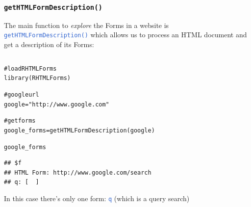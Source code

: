 \documentclass{beamer}\usepackage[]{graphicx}\usepackage[]{color}
\makeatletter
\newcommand{\hlstr}[1]{\textcolor[rgb]{0.063,0.58,0.627}{#1}}%
\newcommand{\hlcom}[1]{\textcolor[rgb]{0.588,0.588,0.588}{#1}}%
\newcommand{\hlopt}[1]{\textcolor[rgb]{0.196,0.196,0.196}{#1}}%
\newcommand{\hlstd}[1]{\textcolor[rgb]{0.196,0.196,0.196}{#1}}%
\newcommand{\hlkwb}[1]{\textcolor[rgb]{0.627,0,0.314}{#1}}%
\newcommand{\hlkwd}[1]{\textcolor[rgb]{0.78,0.227,0.412}{#1}}%
\newenvironment{kframe}{%
 \def\at@end@of@kframe{}%
 \ifinner\ifhmode%
  \def\at@end@of@kframe{\end{minipage}}%
  \begin{minipage}{\columnwidth}%
 \fi\fi%
 \def\FrameCommand##1{\hskip\@totalleftmargin \hskip-\fboxsep
 \colorbox{shadecolor}{##1}\hskip-\fboxsep
     \hskip-\linewidth \hskip-\@totalleftmargin \hskip\columnwidth}%
 \MakeFramed {\advance\hsize-\width
   \@totalleftmargin\z@ \linewidth\hsize
   \@setminipage}}%
 {\par\unskip\endMakeFramed%
 \at@end@of@kframe}
\newenvironment{knitrout}{}{} %
\newcommand{\code}[1]{\texttt{#1}}
\newcommand{\highcode}[1]{\textcolor{highlight}{\texttt{#1}}}
\makeatother
\begin{document}
\begin{frame}[fragile]
\frametitle{\code{getHTMLFormDescription()}}

The main function to \textit{explore} the Forms in a website is \highcode{getHTMLFormDescription()} which allows us to process an HTML document and get a description of its Forms:

\begin{columns}[t]
\begin{column}{0.5\textwidth}
\begin{knitrout}\tiny
{}\color{fgcolor}\begin{kframe}
\begin{alltt}
\hlcom{# load RHTMLForms}
\hlkwd{library}\hlstd{(RHTMLForms)}

\hlcom{# google url}
\hlstd{google} \hlkwb{=} \hlstr{"http://www.google.com"}

\hlcom{# get forms}
\hlstd{google_forms} \hlkwb{=} \hlkwd{getHTMLFormDescription}\hlstd{(google)}

\hlstd{google_forms}
\end{alltt}
\begin{verbatim}
## $f
## HTML Form: http://www.google.com/search 
## q: [  ]
\end{verbatim}
\end{kframe}
\end{knitrout}

In this case there's only one form: \highcode{q} (which is a query search)
\end{column}

\end{columns}

\end{frame}
\end{document}

